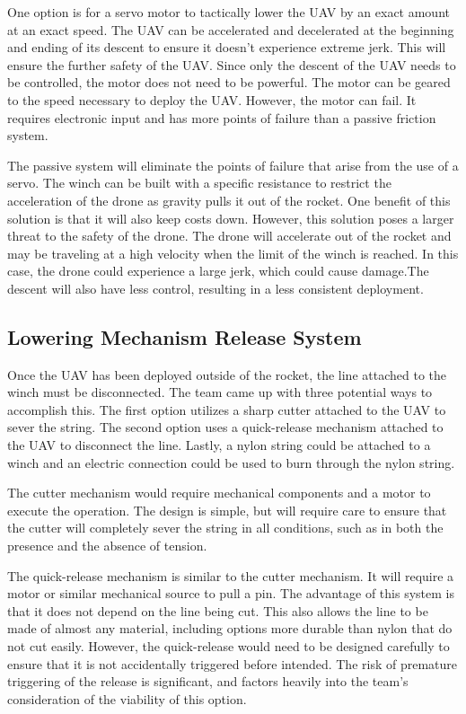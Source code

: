 		One option is for a servo motor to tactically lower the UAV by an exact amount at an exact speed. The UAV can be accelerated and decelerated at the beginning and ending of its descent to ensure it doesn't experience extreme jerk. This will ensure the further safety of the UAV. Since only the descent of the UAV needs to be controlled, the motor does not need to be powerful. The motor can be geared to the speed necessary to deploy the UAV. However, the motor can fail. It requires electronic input and has more points of failure than a passive friction system.
	
		The passive system will eliminate the points of failure that arise from the use of a servo. The winch can be built with a specific resistance to restrict the acceleration of the drone as gravity pulls it out of the rocket. One benefit of this solution is that it will also keep costs down. However, this solution poses a larger threat to the safety of the drone. The drone will accelerate out of the rocket and may be traveling at a high velocity when the limit of the winch is reached. In this case, the drone could experience a large jerk, which could cause damage.The descent will also have less control, resulting in a less consistent deployment.
	
	\subsection{Lowering Mechanism Release System}
		Once the UAV has been deployed outside of the rocket, the line attached to the winch must be disconnected. The team came up with three potential ways to accomplish this. The first option utilizes a sharp cutter attached to the UAV to sever the string. The second option uses a quick-release mechanism attached to the UAV to disconnect the line. Lastly, a nylon string could be attached to a winch and an electric connection could be used to burn through the nylon string. 

		The cutter mechanism would require mechanical components and a motor to execute the operation. The design is simple, but will require care to ensure that the cutter will completely sever the string in all conditions, such as in both the presence and the absence of tension. 
	
		The quick-release mechanism is similar to the cutter mechanism. It will require a motor or similar mechanical source to pull a pin. The advantage of this system is that it does not depend on the line being cut. This also allows the line to be made of almost any material, including options more durable than nylon that do not cut easily. However, the quick-release would need to be designed carefully to ensure that it is not accidentally triggered before intended. The risk of premature triggering of the release is significant, and factors heavily into the team’s consideration of the viability of this option. 
	
